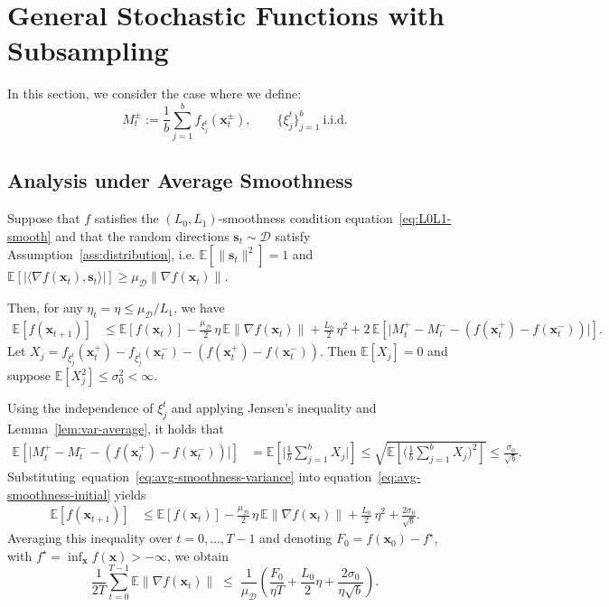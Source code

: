 \documentclass[twoside]{article}
\theoremstyle{plain}
\theoremstyle{definition}
\theoremstyle{remark}
\def\eqref#1{equation~\ref{#1}}
\def\cD{{\mathcal{D}}}
\def\vs{{\bm{s}}}
\def\vx{{\bm{x}}}
\newcommand{\E}{\mathbb{E}}
\begin{document}
\section{General Stochastic Functions with Subsampling}

In this section, we consider the case where we define:
\[
   M_t^\pm := \frac{1}{b} \sum_{j=1}^b f_{\xi^t_j}(\vx_t^\pm),
   \qquad \{\xi^t_j\}_{j=1}^b \ \text{i.i.d.}
\]


\subsection{Analysis under Average Smoothness}


Suppose that $f$ satisfies the $(L_0,L_1)$-smoothness condition
\eqref{eq:L0L1-smooth} and that the random directions $\vs_t \sim \cD$
satisfy Assumption~\ref{ass:distribution}, i.e.
$\E[\|\vs_t\|^2]=1$ and
$\E[|\langle \nabla f(\vx_t),\vs_t\rangle|] \ge \mu_\cD \|\nabla f(\vx_t)\|$.

Then, for any $\eta_t=\eta\le\mu_\cD/L_1$, we have
\begin{align}
\E[f(\vx_{t+1})]
&\le
\E[f(\vx_t)]
- \tfrac{\mu_{\cD}}{2}\,\eta\,\E\|\nabla f(\vx_t)\|
+ \tfrac{L_0}{2}\,\eta^2
+ 2\,\E\!\left[
    \big|
        M_t^+ - M_t^- - (f(\vx_t^+) - f(\vx_t^-))
    \big|
\right].
\label{eq:avg-smoothness-initial}
\end{align}
Let $X_j = f_{\xi^t_j}(\vx_t^+) - f_{\xi^t_j}(\vx_t^-) - (f(\vx_t^+) - f(\vx_t^-))$.
Then $\E[X_j]=0$ and suppose $\E[X_j^2]\le\sigma_0^2 < \infty$.

Using the independence of $\xi^t_j$ and applying Jensen's
inequality and Lemma~\ref{lem:var-average}, it holds that
\begin{align}
\E\!\left[
    \big|
        M_t^+ - M_t^- - (f(\vx_t^+) - f(\vx_t^-))
    \big|
\right]
&= \E\!\left[\Big|\frac{1}{b}\sum_{j=1}^b X_j\Big|\right]
\le \sqrt{\E\!\left[\Big(\frac{1}{b}\sum_{j=1}^b X_j\Big)^2\right]}
\le \frac{\sigma_0}{\sqrt{b}}.
\label{eq:avg-smoothness-variance}
\end{align}
Substituting~\eqref{eq:avg-smoothness-variance} into
\eqref{eq:avg-smoothness-initial} yields
\begin{align}
\E[f(\vx_{t+1})]
&\le
\E[f(\vx_t)]
- \tfrac{\mu_{\cD}}{2}\,\eta\,\E\|\nabla f(\vx_t)\|
+ \tfrac{L_0}{2}\,\eta^2
+ \frac{2\sigma_0}{\sqrt{b}}.
\label{eq:avg-smoothness-recursion}
\end{align}
Averaging this inequality over $t=0,\dots,T-1$ and denoting
$F_0 = f(\vx_0) - f^\star$, with $f^\star = \inf_\vx f(\vx) > -\infty$, we obtain
\begin{equation}
\label{eq:avg-smoothness-gradavg}
\frac{1}{2T}\sum_{t=0}^{T-1} \E\|\nabla f(\vx_t)\|
\;\le\;
\frac{1}{\mu_\cD}
\left(
    \frac{F_0}{\eta T}
    + \frac{L_0}{2}\eta
    + \frac{2\sigma_0}{\eta\sqrt{b}}
\right).
\end{equation}
\end{document}
